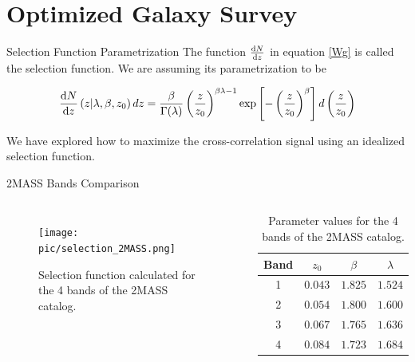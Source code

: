 \documentclass[serif, aspectratio=169]{beamer}
\begin{document}
\section{Optimized Galaxy Survey}

\begin{frame}{Selection Function Parametrization}
    The function $\dv{N}{z}$ in equation \eqref{Wg} is called the selection function. We are assuming its parametrization to be \cite{select_func_par:Afshordi2004}

    \begin{equation}\label{select_func_par}
        \dv{N}{z}\left(z|\lambda, \beta, z_0\right)dz=\frac{\beta}{\Gamma(\lambda)}\left(\frac{z}{z_0}\right)^{\beta\lambda-1}\text{exp}\left[-\left(\frac{z}{z_0}\right)^\beta\right]d\left(\frac{z}{z_0}\right)
    \end{equation}

    We have explored how to maximize the cross-correlation signal using an idealized selection function.
\end{frame}

\begin{frame}{2MASS Bands Comparison}
    \begin{columns}
        \begin{figure}
            \centering
            \texttt{[image: pic/selection\_2MASS.png]}
            \caption{Selection function calculated for the 4 bands of the 2MASS catalog.}
            \label{fig:selection_2MASS}
        \end{figure}
    
        \begin{table}[!htb]
            \centering
            \begin{tabular}{cccc} \hline
             Band & $z_0$ & $\beta$ & $\lambda$ \\ \hline
             1 & $0.043$ & $1.825$ & $1.524$\\
             2 & $0.054$ & $1.800$ & $1.600$ \\
             3 & $0.067$ & $1.765$ & $1.636$\\
             4 & $0.084$ & $1.723$ & $1.684$\\ \hline
            \end{tabular}
            \caption{Parameter values for the 4 bands of the 2MASS catalog.}
            \label{tab:bands_2MASS}
        \end{table}
    \end{columns}
\end{frame}
\end{document}
